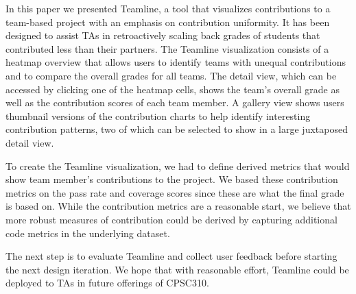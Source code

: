 \documentclass[../manifest.tex]{subfiles}
\begin{document}
In this paper we presented Teamline, a tool that visualizes contributions to a team-based project with an emphasis on contribution uniformity. It has been designed to assist TAs in retroactively scaling back grades of students that contributed less than their partners.  The Teamline visualization consists of a heatmap overview that allows users to identify teams with unequal contributions
and to compare the overall grades for all teams. The detail view, which can be accessed by clicking one of the heatmap cells, shows the team's overall grade as well as the contribution scores of each team member. A gallery view shows users thumbnail versions of the contribution charts to help identify interesting contribution patterns, two of which can be selected to show in a large juxtaposed detail view.

To create the Teamline visualization, we had to define derived metrics that would show team member's contributions to the project. We based these contribution metrics on the pass rate and coverage scores since these are what the final grade is based on. While the contribution metrics are a reasonable start, we believe that more robust measures of contribution could be derived by capturing additional code metrics in the underlying dataset.

The next step is to evaluate Teamline and collect user feedback before starting the next design iteration. We hope that with reasonable effort, Teamline could be deployed to TAs in future offerings of CPSC310.
\end{document}
